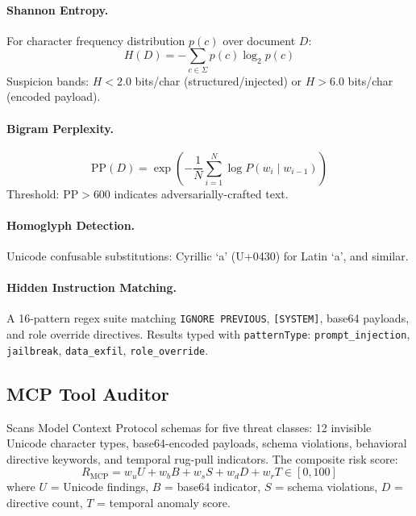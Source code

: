 \documentclass[11pt,twocolumn]{article}
\begin{document}
\paragraph{Shannon Entropy.} For character frequency distribution $p(c)$ over document $D$:
\begin{equation}
H(D) = -\sum_{c \in \Sigma} p(c) \log_2 p(c)
\label{eq:entropy}
\end{equation}
Suspicion bands: $H < 2.0$ bits/char (structured/injected) or $H > 6.0$ bits/char (encoded payload).

\paragraph{Bigram Perplexity.}
\begin{equation}
\text{PP}(D) = \exp\left(-\frac{1}{N}\sum_{i=1}^{N} \log P(w_i \mid w_{i-1})\right)
\label{eq:perplexity}
\end{equation}
Threshold: $\text{PP} > 600$ indicates adversarially-crafted text.

\paragraph{Homoglyph Detection.} Unicode confusable substitutions: Cyrillic `\foreignlanguage{russian}{a}' (U+0430) for Latin `a', and similar.

\paragraph{Hidden Instruction Matching.} A 16-pattern regex suite matching \texttt{IGNORE PREVIOUS}, \texttt{[SYSTEM]}, base64 payloads, and role override directives. Results typed with \texttt{patternType}: \texttt{prompt\_injection}, \texttt{jailbreak}, \texttt{data\_exfil}, \texttt{role\_override}.

\subsection{MCP Tool Auditor}

Scans Model Context Protocol schemas for five threat classes: 12 invisible Unicode character types, base64-encoded payloads, schema violations, behavioral directive keywords, and temporal rug-pull indicators. The composite risk score:
\begin{equation}
R_{\text{MCP}} = w_u U + w_b B + w_s S + w_d D + w_r T \in [0, 100]
\label{eq:mcp}
\end{equation}
where $U$ = Unicode findings, $B$ = base64 indicator, $S$ = schema violations, $D$ = directive count, $T$ = temporal anomaly score.
\end{document}

